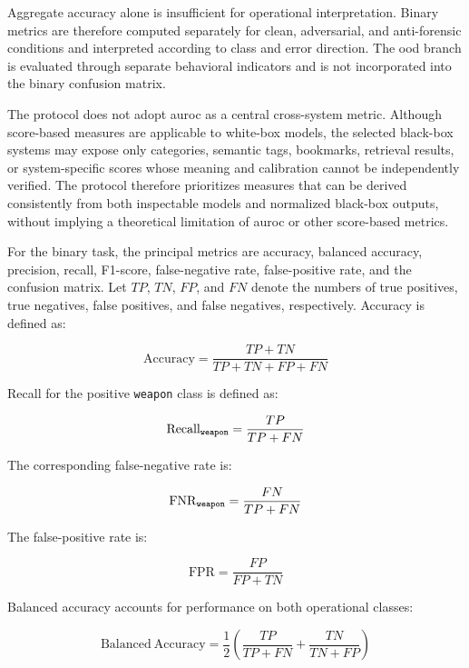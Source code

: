 Aggregate accuracy alone is insufficient for operational interpretation.
Binary metrics are therefore computed separately for clean, adversarial, and
anti-forensic conditions and interpreted according to class and error
direction. The \gls{ood} branch is evaluated through separate behavioral
indicators and is not incorporated into the binary confusion matrix.

The protocol does not adopt \gls{auroc} as a central cross-system metric.
Although score-based measures are applicable to white-box models, the selected
black-box systems may expose only categories, semantic tags, bookmarks,
retrieval results, or system-specific scores whose meaning and calibration
cannot be independently verified. The protocol therefore prioritizes measures
that can be derived consistently from both inspectable models and normalized
black-box outputs, without implying a theoretical limitation of \gls{auroc} or
other score-based metrics.

For the binary task, the principal metrics are accuracy, balanced accuracy,
precision, recall, F1-score, false-negative rate, false-positive rate, and the
confusion matrix. Let \(TP\), \(TN\), \(FP\), and \(FN\) denote the numbers of
true positives, true negatives, false positives, and false negatives,
respectively. Accuracy is defined as:

\begin{equation}
\mathrm{Accuracy}
=
\frac{TP + TN}{TP + TN + FP + FN}
\end{equation}

Recall for the positive \texttt{weapon} class is defined as:

\begin{equation}
\mathrm{Recall}_{\text{\texttt{weapon}}}
=
\frac{TP}{TP + FN}
\end{equation}

The corresponding false-negative rate is:

\begin{equation}
\mathrm{FNR}_{\text{\texttt{weapon}}}
=
\frac{FN}{TP + FN}
\end{equation}

The false-positive rate is:

\begin{equation}
\mathrm{FPR}
=
\frac{FP}{FP + TN}
\end{equation}

Balanced accuracy accounts for performance on both operational classes:

\begin{equation}
\mathrm{Balanced\ Accuracy}
=
\frac{1}{2}
\left(
\frac{TP}{TP + FN}
+
\frac{TN}{TN + FP}
\right)
\end{equation}

